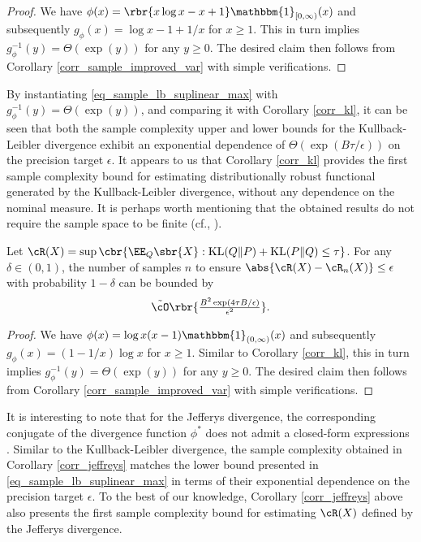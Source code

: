 \documentclass[9pt]{article} %
\numberwithin{equation}{section}
\renewcommand{\frac}[2]{\tfrac{#1}{#2}}
\begin{document}
\begin{proof}
We have $\phi(x) = \rbr{x\log x - x +1}\mathbbm{1}_{[0, \infty)}(x)$
and subsequently $g_\phi(x) = \log x - 1 + 1/x$ for $x \geq 1$. 
This in turn implies $g_\phi^{-1}(y) =\Theta(\exp(y))$ for any $y \geq 0$. 
The desired claim then follows from Corollary \ref{corr_sample_improved_var} with simple verifications. 
\end{proof}

 By instantiating  \eqref{eq_sample_lb_suplinear_max} 
 with $g_\phi^{-1}(y) =\Theta(\exp(y))$, and comparing it with 
 Corollary \ref{corr_kl}, it can be seen that both the sample complexity upper and lower bounds for the Kullback-Leibler divergence exhibit an exponential dependence of $\Theta (\exp(B\tau/\epsilon))$ on the precision target  $\epsilon$.
It appears to us that Corollary \ref{corr_kl} provides the first sample complexity bound for estimating distributionally robust functional generated by the  Kullback-Leibler divergence, without any dependence on the nominal measure. 
 It is perhaps worth mentioning that the obtained results do not require the sample space to be finite (cf., \cite{xu2023improved, shi2024distributionally,wang2024sample}).



\begin{corollary}\label{corr_jeffreys}
Let $\cR(X) = \sup \cbr{\EE_Q \sbr{X}: \mathrm{KL}(Q \Vert P) + \mathrm{KL}(P \Vert Q) \leq \tau}$. 
For any $\delta \in (0,1)$, the number of samples $n$ to ensure $\abs{\cR(X) - \cR_n(X)} \leq \epsilon$ with probability $1-\delta$ can be bounded by 
\begin{align*}
\tilde{\cO} \rbr{
\frac{B^2 \exp(4\tau B/\epsilon)}{\epsilon^2}
}.
\end{align*}
\end{corollary}

\begin{proof}
We have $\phi(x) = \log x (x-1) \mathbbm{1}_{(0,\infty)}(x)$
and subsequently $g_\phi(x) = (1-1/x)\log x$ for $x \geq 1$. 
Similar to Corollary \ref{corr_kl}, this in turn implies $g_\phi^{-1}(y) = \Theta(\exp(y))$ for any $y \geq 0$. 
The desired claim then follows from Corollary \ref{corr_sample_improved_var} with simple verifications. 
\end{proof}

It is interesting to note that for the Jefferys divergence, the corresponding conjugate of the divergence function $\phi^*$ does not admit a closed-form expressions \cite{bayraksan2015data}.
Similar to the Kullback-Leibler divergence, the sample complexity obtained in Corollary \ref{corr_jeffreys} matches the lower bound presented in \eqref{eq_sample_lb_suplinear_max} in terms of their exponential dependence on the precision target $\epsilon$.
To the best of our knowledge, Corollary \ref{corr_jeffreys} above also presents  the first sample complexity bound for estimating $\cR(X)$ defined by the Jefferys divergence. 
\end{document}
